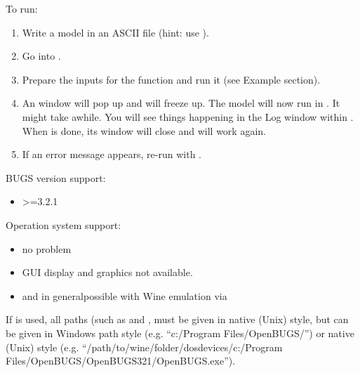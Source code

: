 \begin{Details}\relax
To run:
\begin{enumerate}

\item Write a  model in an ASCII file (hint: use
).
\item Go into \R{}.
\item Prepare the inputs for the  function and run it (see
Example section).
\item An  window will pop up and \R{} will freeze
up. The model will now run in . It might take awhile. You
will see things happening in the Log window within . When
 is done, its window will close and \R{} will work
again.
\item If an error message appears, re-run with .

\end{enumerate}


BUGS version support:
\begin{itemize}

\item {} >=3.2.1

\end{itemize}


Operation system support:
\begin{itemize}

\item {}no problem
\item {}GUI display and graphics not available.
\item {} and  in
generalpossible with Wine emulation via 

\end{itemize}


If  is used, all paths (such as
 and , must be given in
native (Unix) style, but  can be given in
Windows path style (e.g. ``c:/Program Files/OpenBUGS/'') or
native (Unix) style
(e.g. ``/path/to/wine/folder/dosdevices/c:/Program
Files/OpenBUGS/OpenBUGS321/OpenBUGS.exe'').

\end{Details}
%
